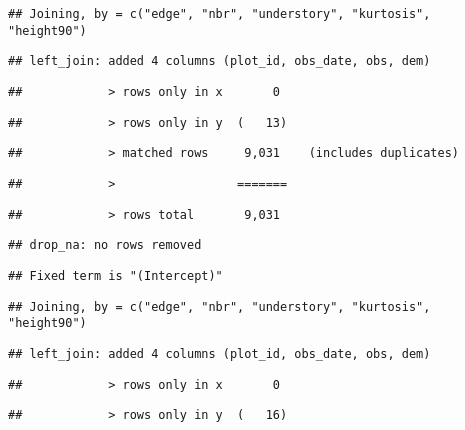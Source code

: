 \documentclass[
]{article}
\begin{document}
\begin{verbatim}
## Joining, by = c("edge", "nbr", "understory", "kurtosis", "height90")
\end{verbatim}

\begin{verbatim}
## left_join: added 4 columns (plot_id, obs_date, obs, dem)
\end{verbatim}

\begin{verbatim}
##            > rows only in x       0
\end{verbatim}

\begin{verbatim}
##            > rows only in y  (   13)
\end{verbatim}

\begin{verbatim}
##            > matched rows     9,031    (includes duplicates)
\end{verbatim}

\begin{verbatim}
##            >                 =======
\end{verbatim}

\begin{verbatim}
##            > rows total       9,031
\end{verbatim}

\begin{verbatim}
## drop_na: no rows removed
\end{verbatim}

\begin{verbatim}
## Fixed term is "(Intercept)"
\end{verbatim}

\begin{verbatim}
## Joining, by = c("edge", "nbr", "understory", "kurtosis", "height90")
\end{verbatim}

\begin{verbatim}
## left_join: added 4 columns (plot_id, obs_date, obs, dem)
\end{verbatim}

\begin{verbatim}
##            > rows only in x       0
\end{verbatim}

\begin{verbatim}
##            > rows only in y  (   16)
\end{verbatim}
\end{document}
